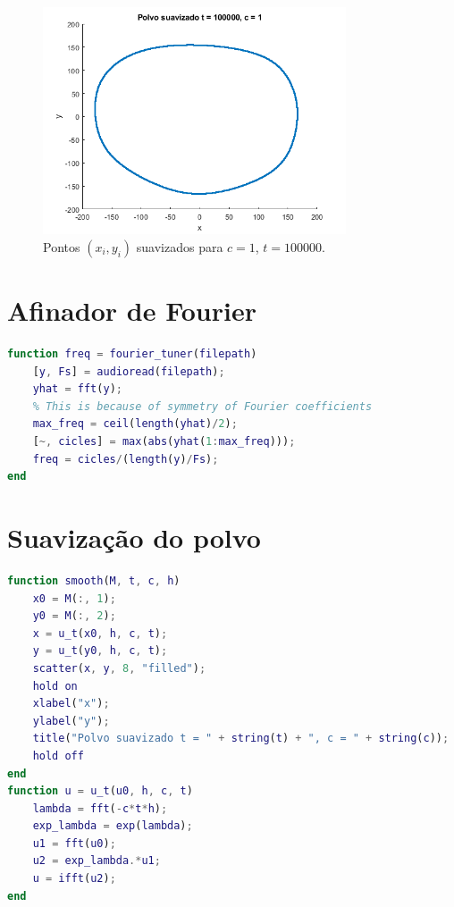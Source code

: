 \documentclass{article}
\begin{document}
\begin{enumerate}
\begin{enumerate}
                        \begin{figure}[!h]
                            \centering
                            \includegraphics[width=0.8\textwidth]{t_100000.png}
                            \caption{Pontos $(x_i, y_i)$ suavizados para $c = 1$, $t = 100000$.}
                            \label{fig:t_100000}
                        \end{figure}

                \end{enumerate}
        \end{enumerate}

    \clearpage

    \appendix

        \section{Afinador de Fourier}
            \label{appendix:tuner}

            \begin{lstlisting}[language=Matlab]
function freq = fourier_tuner(filepath)
    [y, Fs] = audioread(filepath);
    yhat = fft(y);
    % This is because of symmetry of Fourier coefficients
    max_freq = ceil(length(yhat)/2);
    [~, cicles] = max(abs(yhat(1:max_freq)));
    freq = cicles/(length(y)/Fs);
end
            \end{lstlisting}

        \section{Suavização do polvo}
            \label{appendix:octopus}

            \begin{lstlisting}[language=Matlab]
function smooth(M, t, c, h)
    x0 = M(:, 1);
    y0 = M(:, 2);
    x = u_t(x0, h, c, t);
    y = u_t(y0, h, c, t);
    scatter(x, y, 8, "filled");
    hold on
    xlabel("x");
    ylabel("y");
    title("Polvo suavizado t = " + string(t) + ", c = " + string(c));
    hold off
end
function u = u_t(u0, h, c, t)
    lambda = fft(-c*t*h);
    exp_lambda = exp(lambda);
    u1 = fft(u0);
    u2 = exp_lambda.*u1;
    u = ifft(u2);
end
            \end{lstlisting}
\end{document}

